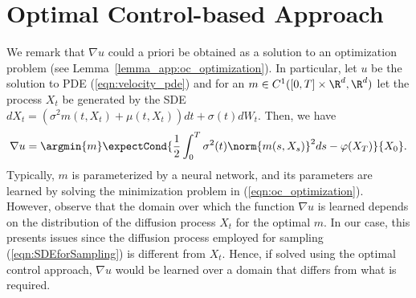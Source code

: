 \section{Optimal Control-based Approach}\label{sec:oc_based_approach}
We remark that $\nabla u$ could a priori be obtained as a solution to an optimization problem (see Lemma~\ref{lemma_app:oc_optimization}). In particular, let $u$ be the solution to PDE (\ref{eqn:velocity_pde}) and for an $m\in C^1([0,T]\times\R^d,\R^d)$ let the process $X_t$ be generated by the SDE $dX_t = \left(\sigma^2 m(t,X_t)+\mu(t,X_t)\right)dt+\sigma(t) dW_t$. Then, we have 
\begin{equation}\label{eqn:oc_optimization}
    \nabla u = \argmin{m} \expectCond{\frac{1}{2}\int_0^T\sigma^2(t)\norm{m(s,X_s)}^2ds-\varphi(X_T)}{X_0}.
\end{equation}
Typically, $m$ is parameterized by a neural network, and its parameters are learned by solving the minimization problem in (\ref{eqn:oc_optimization}). However, observe that the domain over which the function $\nabla u$ is learned depends on the distribution of the diffusion process $X_t$ for the optimal $m$. In our case, this presents issues since the diffusion process employed for sampling (\ref{eqn:SDEforSampling}) is different from $X_t$. Hence, if solved using the optimal control approach, $\nabla u$ would be learned over a domain that differs from what is required.

